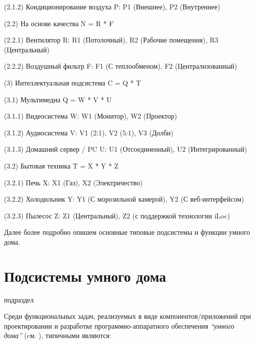 (2.1.2) Кондиционирование воздуха P: P1 (Внешнее), P2 (Внутреннее)

(2.2) На основе качества N = R * F

(2.2.1) Вентилятор R: R1 (Потолочный), R2 (Рабочие помещения), R3 (Центральный)

(2.2.2) Воздушный фильтр F: F1 (С теплообменом), F2 (Централизованный)

(3) Интеллектуальная подсистема C = Q * T

(3.1) Мультимедиа Q = W * V * U

(3.1.1) Видеосистема W: W1 (Монитор), W2 (Проектор)

(3.1.2) Аудиосистема V: V1 (2:1), V2 (5:1), V3 (Долби)

(3.1.3) Домашний сервер / PC U: U1 (Отсоединенный), U2 (Интегрированный)

(3.2) Бытовая техника T = X * Y * Z

(3.2.1) Печь X: X1 (Газ), X2 (Электричество)

(3.2.2) Холодильник Y: Y1 (С морозильной камерой), Y2 (С веб-интерфейсом)

(3.2.3) Пылесос Z: Z1 (Центральный), Z2 (с поддержкой технологии iLoc)


Далее более подробно опишем основные типовые подсистемы и функции умного дома.

\section{Подсистемы умного дома}
\label{sec_SH_subsystems}

\begin{SCn}
	\begin{scnrelfromlist}{подраздел}
	\end{scnrelfromlist}
\end{SCn}

Среди функциональных задач, реализуемых в виде компонентов/приложений при проектировании и разработке программно-аппаратного обеспечения \textit{``умного дома''} (cм. ), типичными являются:

